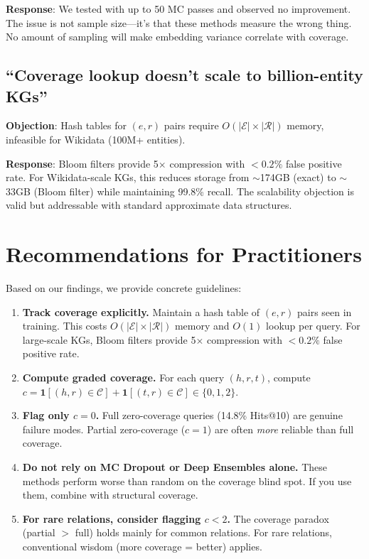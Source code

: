 \documentclass{article}
\begin{document}
\textbf{Response}: We tested with up to 50 MC passes and observed no improvement. The issue is not sample size---it's that these methods measure the wrong thing. No amount of sampling will make embedding variance correlate with coverage.

\subsection{``Coverage lookup doesn't scale to billion-entity KGs''}

\textbf{Objection}: Hash tables for $(e, r)$ pairs require $O(|\mathcal{E}| \times |\mathcal{R}|)$ memory, infeasible for Wikidata (100M+ entities).

\textbf{Response}: Bloom filters provide 5$\times$ compression with $<0.2\%$ false positive rate. For Wikidata-scale KGs, this reduces storage from $\sim$174GB (exact) to $\sim$33GB (Bloom filter) while maintaining 99.8\% recall. The scalability objection is valid but addressable with standard approximate data structures.

\section{Recommendations for Practitioners}
\label{sec:recommendations}

Based on our findings, we provide concrete guidelines:

\begin{enumerate}
    \item \textbf{Track coverage explicitly.} Maintain a hash table of $(e, r)$ pairs seen in training. This costs $O(|\mathcal{E}| \times |\mathcal{R}|)$ memory and $O(1)$ lookup per query. For large-scale KGs, Bloom filters provide 5$\times$ compression with $<0.2\%$ false positive rate.

    \item \textbf{Compute graded coverage.} For each query $(h, r, t)$, compute $c = \mathbf{1}[(h,r) \in \mathcal{C}] + \mathbf{1}[(t,r) \in \mathcal{C}] \in \{0, 1, 2\}$.

    \item \textbf{Flag only $c = 0$.} Full zero-coverage queries (14.8\% Hits@10) are genuine failure modes. Partial zero-coverage ($c = 1$) are often \emph{more} reliable than full coverage.

    \item \textbf{Do not rely on MC Dropout or Deep Ensembles alone.} These methods perform worse than random on the coverage blind spot. If you use them, combine with structural coverage.

    \item \textbf{For rare relations, consider flagging $c < 2$.} The coverage paradox (partial $>$ full) holds mainly for common relations. For rare relations, conventional wisdom (more coverage = better) applies.
\end{enumerate}
\end{document}

